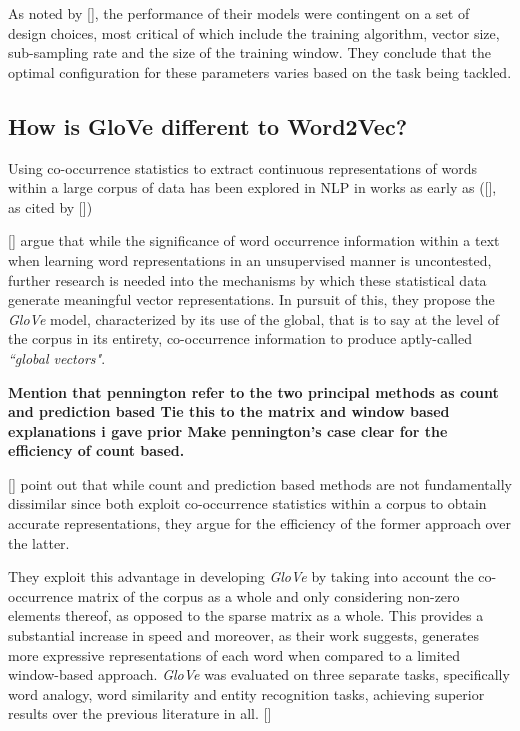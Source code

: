 \documentclass[12pt, a4paper]{report}
\theoremstyle{definition}
\theoremstyle{definition}%
\theoremstyle{definition}%
\theoremstyle{definition}%
\theoremstyle{definition}%
\theoremstyle{definition}%
\renewcommand{\cite}[1]{[\citealp{#1}]}
\begin{document}
As noted by \cite{mikolov2013}, the performance of their models were contingent on a set of design choices, most critical of which include the training algorithm, vector size, sub-sampling rate and the size of the training window. They conclude that the optimal configuration for these parameters varies based on the task being tackled.

\subsection{How is GloVe different to Word2Vec?}
Using co-occurrence statistics to extract continuous representations of words within a large corpus of data has been explored in NLP in works as early as (\cite{rumelhart1988}, as cited by \cite{bojanowski2017})

\cite{pennington} argue that while the significance of word occurrence information within a text when learning word representations in an unsupervised manner is uncontested, further research is needed into the mechanisms by which these statistical data generate meaningful vector representations. In pursuit of this, they propose the \textit{GloVe} model, characterized by its use of the global, that is to say at the level of the corpus in its entirety, co-occurrence information to produce aptly-called \textit{``global vectors"}.

\textbf{Mention that pennington refer to the two principal methods as count and prediction based
Tie this to the matrix and window based explanations i gave prior 
Make pennington's case clear for the efficiency of count based. }

\cite{pennington} point out that while count and prediction based methods are not fundamentally dissimilar since both exploit co-occurrence statistics within a corpus to obtain accurate representations, they argue for the efficiency of the former approach over the latter.

They exploit this advantage in developing \textit{GloVe} by taking into account the co-occurrence matrix of the corpus as a whole and only considering non-zero elements thereof, as opposed to the sparse matrix as a whole. This provides a substantial increase in speed and moreover, as their work suggests, generates more expressive representations of each word when compared to a limited window-based approach. \textit{GloVe} was evaluated on three separate tasks, specifically word analogy, word similarity and entity recognition tasks, achieving superior results over the previous literature in all. \cite{pennington}
\end{document}
